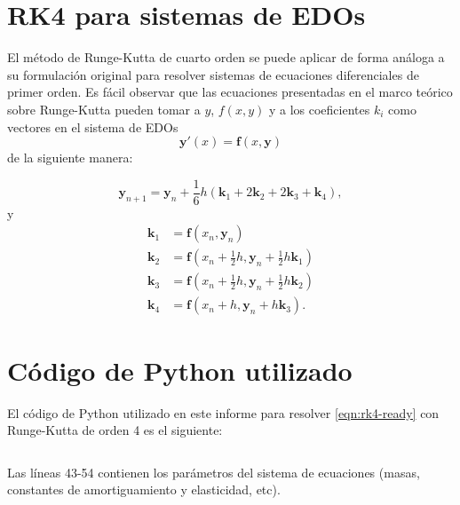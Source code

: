 \begin{appendices}

\section{RK4 para sistemas de EDOs}\label{appendix:rk4-systems}

El método de Runge-Kutta de cuarto orden se puede aplicar de forma análoga a su formulación original para resolver sistemas de ecuaciones diferenciales de primer orden. Es fácil observar que las ecuaciones presentadas en el marco teórico sobre Runge-Kutta pueden tomar a \(y\), \(f(x, y)\) y a los coeficientes \(k_i\) como vectores en el sistema de EDOs
\[
    \mathbf{y}'(x) = \mathbf{f}(x, \mathbf{y})
\]
de la siguiente manera:

\[
    \mathbf{y}_{n+1} = \mathbf{y}_n + \frac{1}{6}h(\mathbf{k}_1 + 2\mathbf{k}_2 + 2\mathbf{k}_3 + \mathbf{k}_4)
,\]
y
\begin{align*}
    \mathbf{k}_1 &= \mathbf{f}(x_n, \mathbf{y}_n) \\
    \mathbf{k}_2 &= \mathbf{f}(x_n + \frac{1}{2}h, \mathbf{y}_n + \frac{1}{2}h\mathbf{k}_1) \\
    \mathbf{k}_3 &= \mathbf{f}(x_n + \frac{1}{2}h, \mathbf{y}_n + \frac{1}{2}h\mathbf{k}_2) \\
    \mathbf{k}_4 &= \mathbf{f}(x_n + h, \mathbf{y}_n + h\mathbf{k}_3)
.\end{align*}


\section{Código de Python utilizado}\label{appendix:rk4-code}

El código de Python utilizado en este informe para resolver \eqref{eqn:rk4-ready} con Runge-Kutta de orden 4 es el siguiente:

\inputminted{python}{./rk4.py}

Las líneas 43-54 contienen los parámetros del sistema de ecuaciones (masas, constantes de amortiguamiento y elasticidad, etc).

\end{appendices}
